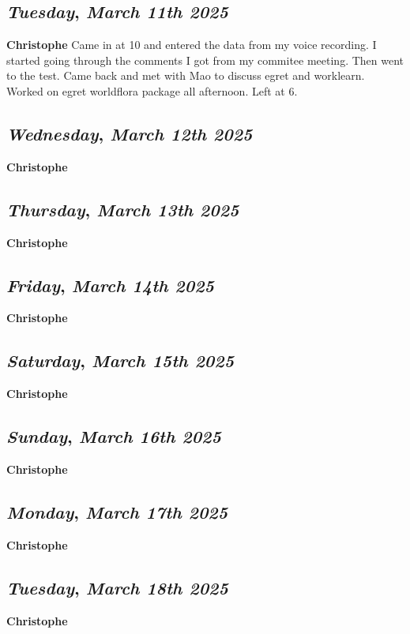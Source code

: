 \def\day{\textit{March 11th 2025}}
\def\weekday{\textit{Tuesday}}
\subsection*{\weekday, \day}
\textbf {Christophe}
Came in at 10 and entered the data from my voice recording. I started going through the comments I got from my commitee meeting. Then went to the test. Came back and met with Mao to discuss egret and worklearn. Worked on egret worldflora package all afternoon. Left at 6.

\def\day{\textit{March 12th 2025}}
\def\weekday{\textit{Wednesday}}
\subsection*{\weekday, \day}
\textbf {Christophe}

\def\day{\textit{March 13th 2025}}
\def\weekday{\textit{Thursday}}
\subsection*{\weekday, \day}
\textbf {Christophe}

\def\day{\textit{March 14th 2025}}
\def\weekday{\textit{Friday}}
\subsection*{\weekday, \day}
\textbf {Christophe}

\def\day{\textit{March 15th 2025}}
\def\weekday{\textit{Saturday}}
\subsection*{\weekday, \day}
\textbf {Christophe}

\def\day{\textit{March 16th 2025}}
\def\weekday{\textit{Sunday}}
\subsection*{\weekday, \day}
\textbf {Christophe}

\def\day{\textit{March 17th 2025}}
\def\weekday{\textit{Monday}}
\subsection*{\weekday, \day}
\textbf {Christophe}

\def\day{\textit{March 18th 2025}}
\def\weekday{\textit{Tuesday}}
\subsection*{\weekday, \day}
\textbf {Christophe}

